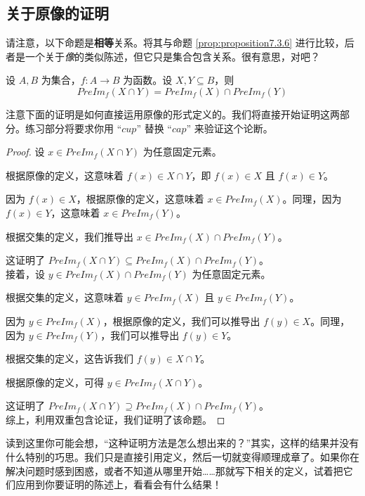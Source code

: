 
\subsection{关于原像的证明}

请注意，以下命题是\textbf{相等}关系。将其与命题 \ref{prop:proposition7.3.6} 进行比较，后者是一个关于\emph{像}的类似陈述，但它只是集合包含关系。很有意思，对吧？

\begin{proposition}
    设 $A,B$ 为集合，$f:A \to B$ 为函数。设 $X, Y \subseteq B$，则
    \[PreIm_f (X \cap Y) = PreIm_f (X) \cap PreIm_f (Y)\]
\end{proposition}

注意下面的证明是如何直接运用原像的形式定义的。我们将直接开始证明这两部分。练习部分将要求你用 ``$cup$'' 替换 ``$cap$'' 来验证这个论断。

\begin{proof}
    设 $x \in PreIm_f (X \cap Y)$ 为任意固定元素。

    根据原像的定义，这意味着 $f(x) \in X \cap Y$，即 $f(x) \in X$ 且 $f(x) \in Y$。

    因为 $f(x) \in X$，根据原像的定义，这意味着 $x \in PreIm_f (X)$。同理，因为 $f(x) \in Y$，这意味着 $x \in PreIm_f (Y)$。

    根据交集的定义，我们推导出 $x \in PreIm_f(X) \cap PreIm_f(Y)$。

    这证明了 $PreIm_f(X \cap Y) \subseteq PreIm_f(X) \cap PreIm_f(Y)$。\\

    接着，设 $y \in PreIm_f(X) \cap PreIm_f(Y)$ 为任意固定元素。

    根据交集的定义，这意味着 $y \in PreIm_f (X)$ 且 $y \in PreIm_f (Y)$。

    因为 $y \in PreIm_f (X)$，根据原像的定义，我们可以推导出 $f(y) \in X$。同理，因为 $y \in PreIm_f (Y)$，我们可以推导出 $f(y) \in Y$。

    根据交集的定义，这告诉我们 $f(y) \in X \cap Y$。

    根据原像的定义，可得 $y \in PreIm_f(X \cap Y)$。

    这证明了 $ PreIm_f(X \cap Y) \supseteq PreIm_f(X) \cap PreIm_f(Y)$。 \\

    综上，利用双重包含论证，我们证明了该命题。
\end{proof}

读到这里你可能会想，``这种证明方法是怎么想出来的？''其实，这样的结果并没有什么特别的巧思。我们只是直接引用定义，然后一切就变得顺理成章了。如果你在解决问题时感到困惑，或者不知道从哪里开始……那就写下相关的定义，试着把它们应用到你要证明的陈述上，看看会有什么结果！

